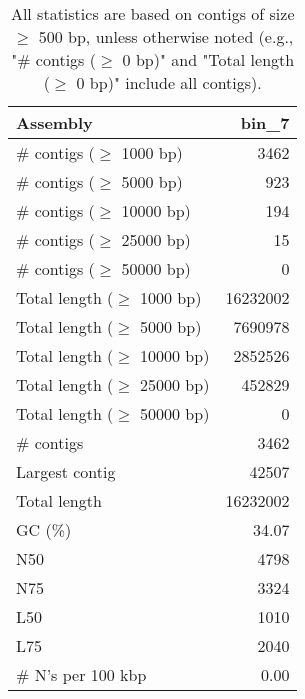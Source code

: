 \documentclass[12pt,a4paper]{article}
\begin{document}
\begin{table}[ht]
\begin{center}
\caption{All statistics are based on contigs of size $\geq$ 500 bp, unless otherwise noted (e.g., "\# contigs ($\geq$ 0 bp)" and "Total length ($\geq$ 0 bp)" include all contigs).}
\begin{tabular}{|l*{1}{|r}|}
\hline
Assembly & bin\_7 \\ \hline
\# contigs ($\geq$ 1000 bp) & 3462 \\ \hline
\# contigs ($\geq$ 5000 bp) & 923 \\ \hline
\# contigs ($\geq$ 10000 bp) & 194 \\ \hline
\# contigs ($\geq$ 25000 bp) & 15 \\ \hline
\# contigs ($\geq$ 50000 bp) & 0 \\ \hline
Total length ($\geq$ 1000 bp) & 16232002 \\ \hline
Total length ($\geq$ 5000 bp) & 7690978 \\ \hline
Total length ($\geq$ 10000 bp) & 2852526 \\ \hline
Total length ($\geq$ 25000 bp) & 452829 \\ \hline
Total length ($\geq$ 50000 bp) & 0 \\ \hline
\# contigs & 3462 \\ \hline
Largest contig & 42507 \\ \hline
Total length & 16232002 \\ \hline
GC (\%) & 34.07 \\ \hline
N50 & 4798 \\ \hline
N75 & 3324 \\ \hline
L50 & 1010 \\ \hline
L75 & 2040 \\ \hline
\# N's per 100 kbp & 0.00 \\ \hline
\end{tabular}
\end{center}
\end{table}
\end{document}
